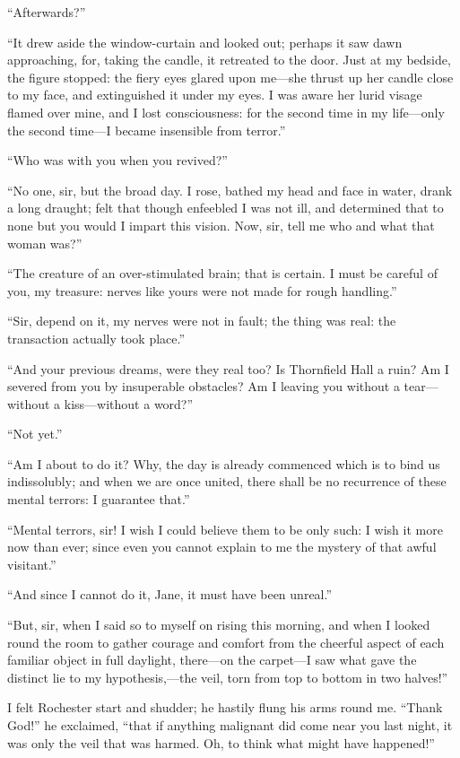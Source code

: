 \enquote{Afterwards?}

\enquote{It drew aside the window-curtain and looked out; perhaps it saw
dawn approaching, for, taking the candle, it retreated to the door. 
Just at my bedside, the figure stopped: the fiery eyes glared upon
me---she thrust up her candle close to my face, and extinguished it
under my eyes.  I was aware her lurid visage flamed over mine, and I
lost consciousness: for the second time in my life---only the second
time---I became insensible from terror.}

\enquote{Who was with you when you revived?}

\enquote{No one, sir, but the broad day.  I rose, bathed my head and
face in water, drank a long draught; felt that though enfeebled I was
not ill, and determined that to none but you would I impart this
vision.  Now, sir, tell me who and what that woman was?}

\enquote{The creature of an over-stimulated brain; that is certain.  I
must be careful of you, my treasure: nerves like yours were not made for
rough handling.}

\enquote{Sir, depend on it, my nerves were not in fault; the thing was
real: the transaction actually took place.}

\enquote{And your previous dreams, were they real too?  Is Thornfield
Hall a ruin?  Am I severed from you by insuperable obstacles?  Am I
leaving you without a tear---without a kiss---without a word?}

\enquote{Not yet.}

\enquote{Am I about to do it?  Why, the day is already commenced which
is to bind us indissolubly; and when we are once united, there shall be
no recurrence of these mental terrors: I guarantee that.}

\enquote{Mental terrors, sir!  I wish I could believe them to be only
such: I wish it more now than ever; since even you cannot explain to me
the mystery of that awful visitant.}

\enquote{And since I cannot do it, Jane, it must have been unreal.}

\enquote{But, sir, when I said so to myself on rising this morning, and
when I looked round the room to gather courage and comfort from the
cheerful aspect of each familiar object in full daylight, there---on the
carpet---I saw what gave the distinct lie to my hypothesis,---the veil,
torn from top to bottom in two halves!}

I felt \Mr{} Rochester start and shudder; he hastily flung his arms round
me.  \enquote{Thank God!} he exclaimed, \enquote{that if anything
malignant did come near you last night, it was only the veil that was
harmed.  Oh, to think what might have happened!}


